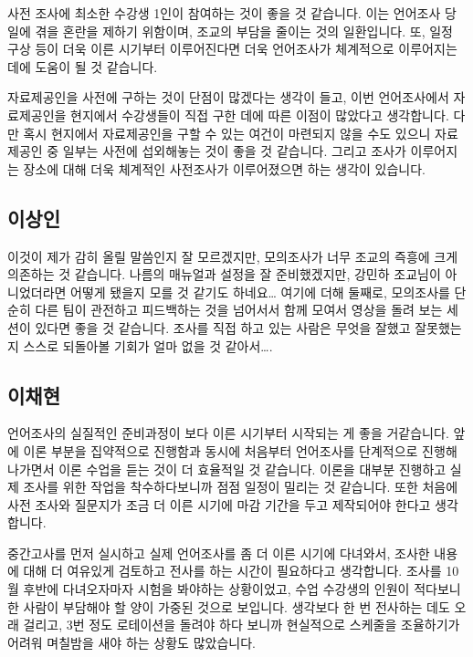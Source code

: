 사전 조사에 최소한 수강생 1인이 참여하는 것이 좋을 것 같습니다. 이는 언어조사 당일에 겪을 혼란을 제하기 위함이며, 조교의 부담을 줄이는 것의 일환입니다. 또, 일정 구상 등이 더욱 이른 시기부터 이루어진다면 더욱 언어조사가 체계적으로 이루어지는 데에 도움이 될 것 같습니다.

자료제공인을 사전에 구하는 것이 단점이 많겠다는 생각이 들고, 이번 언어조사에서 자료제공인을 현지에서 수강생들이 직접 구한 데에 따른 이점이 많았다고 생각합니다. 다만 혹시 현지에서 자료제공인을 구할 수 있는 여건이 마련되지 않을 수도 있으니 자료제공인 중 일부는 사전에 섭외해놓는 것이 좋을 것 같습니다. 그리고 조사가 이루어지는 장소에 대해 더욱 체계적인 사전조사가 이루어졌으면 하는 생각이 있습니다.

\subsection{이상인}

이것이 제가 감히 올릴 말씀인지 잘 모르겠지만, 모의조사가 너무 조교의 즉흥에 크게 의존하는 것 같습니다. 나름의 매뉴얼과 설정을 잘 준비했겠지만, 강민하 조교님이 아니었더라면 어떻게 됐을지 모를 것 같기도 하네요… 여기에 더해 둘째로, 모의조사를 단순히 다른 팀이 관전하고 피드백하는 것을 넘어서서 함께 모여서 영상을 돌려 보는 세션이 있다면 좋을 것 같습니다. 조사를 직접 하고 있는 사람은 무엇을 잘했고 잘못했는지 스스로 되돌아볼 기회가 얼마 없을 것 같아서….

\subsection{이채현}

언어조사의 실질적인 준비과정이 보다 이른 시기부터 시작되는 게 좋을 거같습니다. 앞에 이론 부분을 집약적으로 진행함과 동시에 처음부터 언어조사를 단계적으로 진행해나가면서 이론 수업을 듣는 것이 더 효율적일 것 같습니다. 이론을 대부분 진행하고 실제 조사를 위한 작업을 착수하다보니까 점점 일정이 밀리는 것 같습니다. 또한 처음에 사전 조사와 질문지가 조금 더 이른 시기에 마감 기간을 두고 제작되어야 한다고 생각합니다.

중간고사를 먼저 실시하고 실제 언어조사를 좀 더 이른 시기에 다녀와서, 조사한 내용에 대해 더 여유있게 검토하고 전사를 하는 시간이 필요하다고 생각합니다. 조사를 10월 후반에 다녀오자마자 시험을 봐야하는 상황이었고, 수업 수강생의 인원이 적다보니 한 사람이 부담해야 할 양이 가중된 것으로 보입니다. 생각보다 한 번 전사하는 데도 오래 걸리고, 3번 정도 로테이션을 돌려야 하다 보니까 현실적으로 스케줄을 조율하기가 어려워 며칠밤을 새야 하는 상황도 많았습니다. 

